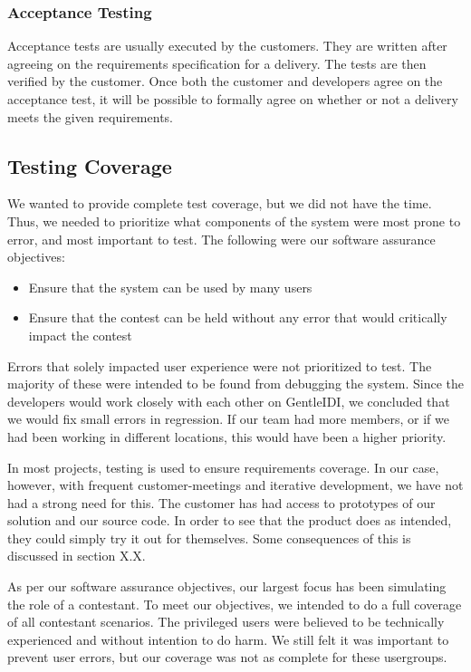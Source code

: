 \subsubsection{Acceptance Testing}
Acceptance tests are usually executed by the customers. They are written
after agreeing on the requirements specification for a delivery. The
tests are then verified by the customer. Once both the customer and
developers agree on the acceptance test, it will be possible to
formally agree on whether or not a delivery meets the given
requirements.

\subsection{Testing Coverage}
We wanted to provide complete test coverage, but we did not have the
time. Thus, we needed to prioritize what components of the system were
most prone to error, and most important to test. The following were our
software assurance objectives:
\begin{itemize}
    \item Ensure that the system can be used by many users
    \item Ensure that the contest can be held without any error that would
critically impact the contest
\end{itemize}

Errors that solely impacted user experience were not prioritized to
test. The majority of these were intended to be found from debugging
the system. Since the developers would work closely with each other on
GentleIDI, we concluded that we would fix small errors in regression.
If our team had more members, or if we had been working in different
locations, this would have been a higher priority.

In most projects, testing is used to ensure requirements coverage. In
our case, however, with frequent customer-meetings and iterative
development, we have not had a strong need for this. The customer has
had access to prototypes of our solution and our source code. In order
to see that the product does as intended, they could simply try it out
for themselves. Some consequences of this is discussed in section X.X.

As per our software assurance objectives, our largest focus has been
simulating the role of a contestant. To meet our objectives, we
intended to do a full coverage of all contestant scenarios. The
privileged users were believed to be technically experienced and
without intention to do harm. We still felt it was important to prevent
user errors, but our coverage was not as complete for these
usergroups.

